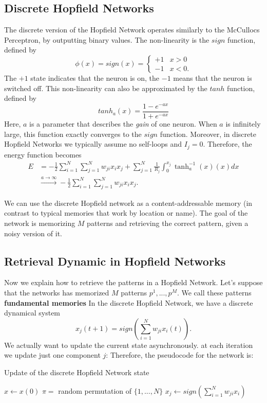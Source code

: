 \documentclass[oneside]{book}
\theoremstyle{definition}
\theoremstyle{plain}
\begin{document}
\subsection{Discrete Hopfield Networks}
The discrete version of the Hopfield Network operates similarly to the McCullocs Perceptron, by outputting binary values.
The non-linearity is the $sign$ function, defined by
\[
    \phi(x)=sign(x) =\begin{cases}
        +1 & x>0\\
        -1 & x<0.
    \end{cases}
\]
The $+1$ state indicates that the neuron is on, the $-1$ means that the neuron is switched off.
This non-linearity can also be approximated by the $tanh$ function, defined by
\[
    tanh_a(x) = \frac{1-e^{-ax}}{1+e^{-ax}}
\]
Here, $a$ is a parameter that describes the \textit{gain} of one neuron. When $a$ is infinitely large, this function exactly converges to the $sign$ function. 
Moreover, in discrete Hopfield Networks we typically assume no self-loops and $I_j=0$. 
Therefore, the energy function becomes
\begin{align*}
    E &= -\frac{1}{2}\sum_{i=1}^N\sum_{j=1}^N w_{ji}x_ix_j + \sum_{j=1}^N \frac{1}{R_j} \int_{0}^{x_j} \tanh_a^{-1}(x)(x)dx \\&\xrightarrow{a\to \infty} -\frac{1}{2}\sum_{i=1}^N\sum_{j=1}^N w_{ji}x_ix_j.
\end{align*}

We can use the discrete Hopfield network as a content-addressable memory (in contrast to typical memories that work by location or name). The goal of the network is memorizing $M$ patterns and retrieving the correct pattern, given a noisy version of it.
\subsection{Retrieval Dynamic in Hopfield Networks}
Now we explain how to retrieve the patterns in a Hopfield Network. Let's suppose that the networks has memorized $M$ patterns $p^1,...,p^M$. We call these patterns \textbf{fundamental memories}
In the discrete Hopfield Network, we have a discrete dynamical system
\begin{equation}
    x_j(t+1) = sign\left(\sum_{i=1}^N w_{ji}x_i(t)\right).
\end{equation}
We actually want to update the current state asynchronously. at each iteration we update just one  component $j$:
Therefore, the  pseudocode for the network is:
\begin{algorithm}
\caption{Update of the discrete Hopfield Network state}\label{alg:hopfield}
\begin{algorithmic}
\State $x\gets x(0)$
    \State $\pi=$ random permutation of $\{1,...,N\}$
        \State $x_j \gets sign\left(\sum_{i=1}^N w_{ji}x_i\right)$
    \EndFor
\EndWhile
\end{algorithmic}
\end{algorithm}
\end{document}
